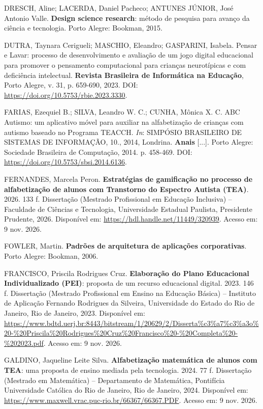 \begin{referenciasIFTO}
DRESCH, Aline; LACERDA, Daniel Pacheco; ANTUNES JÚNIOR, José Antonio Valle. \textbf{Design science research}: método de pesquisa para avanço da ciência e tecnologia. Porto Alegre: Bookman, 2015.

DUTRA, Taynara Cerigueli; MASCHIO, Eleandro; GASPARINI, Isabela. Pensar e Lavar: processo de desenvolvimento e avaliação de um jogo digital educacional para promover o pensamento computacional para crianças neurotípicas e com deficiência intelectual. \textbf{Revista Brasileira de Informática na Educação}, Porto Alegre, v. 31, p. 659-690, 2023. DOI: \url{https://doi.org/10.5753/rbie.2023.3330}.

FARIAS, Ezequiel B.; SILVA, Leandro W. C.; CUNHA, Mônica X. C. ABC Autismo: um aplicativo móvel para auxiliar na alfabetização de crianças com autismo baseado no Programa TEACCH. \textit{In}: SIMPÓSIO BRASILEIRO DE SISTEMAS DE INFORMAÇÃO, 10., 2014, Londrina. \textbf{Anais} [...]. Porto Alegre: Sociedade Brasileira de Computação, 2014. p. 458-469. DOI: \url{https://doi.org/10.5753/sbsi.2014.6136}.

FERNANDES, Marcela Peron. \textbf{Estratégias de gamificação no processo de alfabetização de alunos com Transtorno do Espectro Autista (TEA)}. 2026. 133 f. Dissertação (Mestrado Profissional em Educação Inclusiva) – Faculdade de Ciências e Tecnologia, Universidade Estadual Paulista, Presidente Prudente, 2026. Disponível em: \url{https://hdl.handle.net/11449/320939}. Acesso em: 9 nov. 2026.

FOWLER, Martin. \textbf{Padrões de arquitetura de aplicações corporativas}. Porto Alegre: Bookman, 2006.

FRANCISCO, Priscila Rodrigues Cruz. \textbf{Elaboração do Plano Educacional Individualizado (PEI)}: proposta de um recurso educacional digital. 2023. 146 f. Dissertação (Mestrado Profissional em Ensino na Educação Básica) – Instituto de Aplicação Fernando Rodrigues da Silveira, Universidade do Estado do Rio de Janeiro, Rio de Janeiro, 2023. Disponível em: \url{https://www.bdtd.uerj.br:8443/bitstream/1/20629/2/Disserta%c3%a7%c3%a3o%20-%20Priscila%20Rodrigues%20Cruz%20Francisco%20-%20Completa%20-%202023.pdf}. Acesso em: 9 nov. 2026.

GALDINO, Jaqueline Leite Silva. \textbf{Alfabetização matemática de alunos com TEA}: uma proposta de ensino mediada pela tecnologia. 2024. 77 f. Dissertação (Mestrado em Matemática) – Departamento de Matemática, Pontifícia Universidade Católica do Rio de Janeiro, Rio de Janeiro, 2024. Disponível em: \url{https://www.maxwell.vrac.puc-rio.br/66367/66367.PDF}. Acesso em: 9 nov. 2026.


\end{referenciasIFTO}
